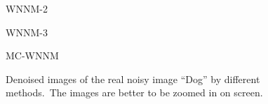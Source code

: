 \begin{figure}
{\begin{minipage}[t]{0.19\textwidth}
{\footnotesize WNNM-2 }
\end{minipage}
\begin{minipage}[t]{0.19\textwidth}
\centering
{}
{\footnotesize WNNM-3 }
\end{minipage}
\begin{minipage}[t]{0.19\textwidth}
\centering
{}
{\footnotesize MC-WNNM }
\end{minipage}
}
    \caption{Denoised images of the real noisy image ``Dog'' \cite{ncwebsite} by different methods.\ The images are better to be zoomed in on screen.}
    \label{fig4-8}
\end{figure}


